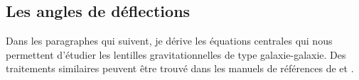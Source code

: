 





\subsection{Les angles de déflections}
Dans les paragraphes qui suivent, je dérive les équations centrales qui nous permettent 
d'étudier les lentilles gravitationnelles de type galaxie-galaxie.
Des traitements similaires 
peuvent être trouvé dans les manuels de références de \citet{Meneghetti2013} et 
\citet{Carroll2003}.

